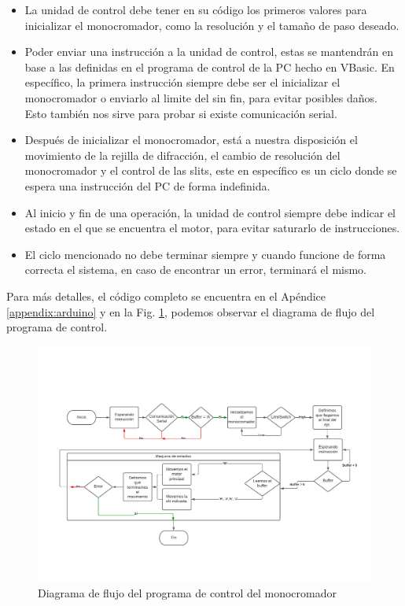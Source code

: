 \begin{itemize}
    \item La unidad de control debe tener en su código los primeros valores para inicializar el monocromador, como la resolución y el tamaño de paso deseado.
    \item Poder enviar una instrucción a la unidad de control, estas se mantendrán en base a las definidas en el programa de control de la PC hecho en VBasic. En específico, la primera instrucción siempre debe ser el inicializar el monocromador o enviarlo al limite del sin fin, para evitar posibles daños. Esto también nos sirve para probar si existe comunicación serial.
    \item Después de inicializar el monocromador, está a nuestra disposición el movimiento de la rejilla de difracción, el cambio de resolución del monocromador y el control de las slits, este en específico es un ciclo donde se espera una instrucción del PC de forma indefinida.
    \item Al inicio y fin de una operación, la unidad de control siempre debe indicar el estado en el que se encuentra el motor, para evitar saturarlo de instrucciones.
    \item El ciclo mencionado no debe terminar siempre y cuando funcione de forma correcta el sistema, en caso de encontrar un error, terminará el mismo.
\end{itemize}

Para más detalles, el código completo se encuentra en el Apéndice \ref{appendix:arduino} y en la Fig. \ref{fig:mono_flow}, podemos observar el diagrama de flujo del programa de control.
\newpage

\begin{figure}[H]
    \centering
    \includegraphics[width=1.5\textwidth, angle=270]{figures/chap2/monocromador.pdf}
        \caption{Diagrama de flujo del programa de control del monocromador}
    \label{fig:mono_flow}
\end{figure}
